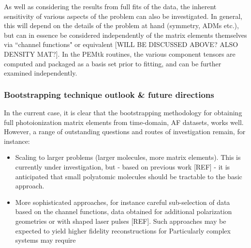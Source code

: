 As well as considering the results from full fits of the data, the inherent sensitivity of various aspects of the problem can also be investigated. In general, this will depend on the details of the problem at hand (symmetry, ADMs etc.), but can in essence be considered independently of the matrix elements themselves via ``channel functions" or equivalent [WILL BE DISCUSSED ABOVE? ALSO DENSITY MAT?]. In the PEMtk routines, the various component tensors are computed and packaged as a basis set prior to fitting, and can be further examined independently.


\subsubsection{Bootstrapping technique outlook \& future directions}

In the current case, it is clear that the bootstrapping methodology for obtaining full photoionization matrix elements from time-domain, AF datasets, works well. However, a range of outstanding questions and routes of investigation remain, for instance:

\begin{itemize}
\item Scaling to larger problems (larger molecules, more matrix elements). This is currently under investigation, but - based on previous work [REF] - it is anticipated that small polyatomic molecules should be tractable to the basic approach. 
\item More sophisticated approaches, for instance careful sub-selection of data based on the channel functions, data obtained for additional polarization geometries or with shaped laser pulses [REF]. Such approaches may be expected to yield higher fidelity reconstructions for Particularly complex systems may require 
\end{itemize}
